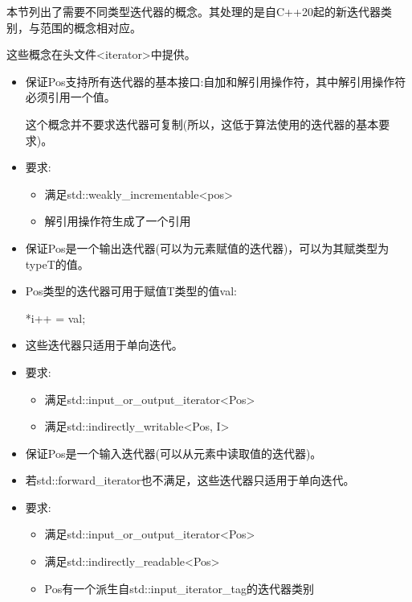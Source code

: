 
本节列出了需要不同类型迭代器的概念。其处理的是自C++20起的新迭代器类别，与范围的概念相对应。

这些概念在头文件<iterator>中提供。


\begin{itemize}
\item
保证Pos支持所有迭代器的基本接口:自加和解引用操作符，其中解引用操作符必须引用一个值。

这个概念并不要求迭代器可复制(所以，这低于算法使用的迭代器的基本要求)。

\item
要求:
\begin{itemize}
\item
满足std::weakly\_incrementable<pos>

\item
解引用操作符生成了一个引用
\end{itemize}
\end{itemize}


\begin{itemize}
\item
保证Pos是一个输出迭代器(可以为元素赋值的迭代器)，可以为其赋类型为typeT的值。

\item
Pos类型的迭代器可用于赋值T类型的值val:

\begin{cpp}
*i++ = val;
\end{cpp}

\item
这些迭代器只适用于单向迭代。

\item
要求:
\begin{itemize}
\item
满足std::input\_or\_output\_iterator<Pos>

\item
满足std::indirectly\_writable<Pos, I>
\end{itemize}
\end{itemize}


\begin{itemize}
\item
保证Pos是一个输入迭代器(可以从元素中读取值的迭代器)。

\item
若std::forward\_iterator也不满足，这些迭代器只适用于单向迭代。

\item
要求:
\begin{itemize}
\item
满足std::input\_or\_output\_iterator<Pos>

\item
满足std::indirectly\_readable<Pos>

\item
Pos有一个派生自std::input\_iterator\_tag的迭代器类别
\end{itemize}
\end{itemize}

